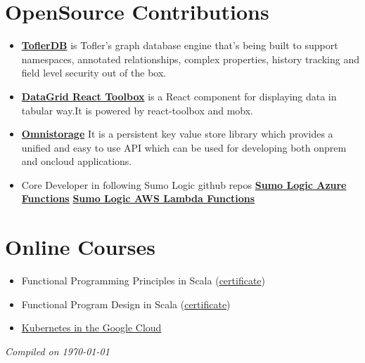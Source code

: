 \documentclass[margin,line]{resume}
\begin{document}
\begin{resume}
\section{\mysidestyle OpenSource Contributions}
\vspace{0mm}
    \begin{itemize}
                \item \href{https://github.com/tofler/toflerdb}{\textbf{ToflerDB}} is Tofler's graph database engine that's being built to support namespaces, annotated relationships, complex properties, history tracking and field level security out of the box.
                \item \href{https://github.com/tofler/datagrid-react-toolbox}{\textbf{DataGrid React Toolbox}} is a React component for displaying data in tabular way.It is powered by react-toolbox and mobx.
                \item \href{https://github.com/Sumologic/sumologic-omnistorage}{\textbf{Omnistorage}} It is a persistent key value store library which provides a unified and easy to use API which can be used for developing both onprem and oncloud applications.
                \item Core Developer in following Sumo Logic github repos
                \subitem \href{https://github.com/SumoLogic/sumologic-azure-function}{\textbf{Sumo Logic Azure Functions}}
                \subitem \href{https://github.com/SumoLogic/sumologic-aws-lambda}{\textbf{Sumo Logic AWS Lambda Functions}}

    \end{itemize}

\section{\mysidestyle Online Courses}
\vspace{0mm}
    \begin{itemize}
        \item Functional Programming Principles in Scala (\href{https://www.coursera.org/account/accomplishments/verify/AU47C6WSX6NR}{certificate})
        \item Functional Program Design in Scala (\href{https://www.coursera.org/account/accomplishments/certificate/VUBNK7HMZENA}{certificate})
        \item \href{https://google.qwiklabs.com/quests/29}{Kubernetes in the Google Cloud}
    \end{itemize}

\hfill \textsl{Compiled on \monthyeardate\today}
%
\end{resume}
\end{document}
